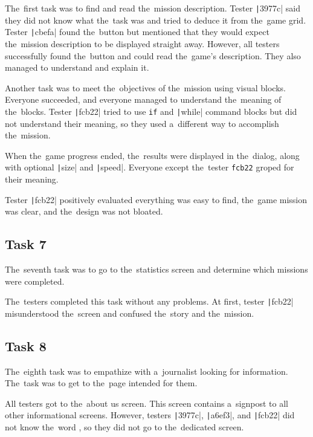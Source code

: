 The~first task was to find and read the~mission description.
Tester \texttt|3977c| said they did not know what the~task was and tried to deduce it from the~game grid.
Tester \texttt|cbefa| found the~button but mentioned that they would expect the~mission description to be displayed straight away.
However, all testers successfully found the~button and could read the~game's description.
They also managed to understand and explain it.

Another task was to meet the~objectives of the~mission using visual blocks.
Everyone succeeded, and everyone managed to understand the~meaning of the~blocks.
Tester \texttt|fcb22| tried to use \mintinline {text}|if| and \texttt|while| command blocks but did not understand their meaning, so they used a~different way to accomplish the~mission.

When the~game progress ended, the~results were displayed in the~dialog, along with optional \texttt|size| and \texttt|speed|.
Everyone except the~tester \mintinline {text}|fcb22| groped for their meaning.

Tester \texttt|fcb22| positively evaluated everything was easy to find, the~game mission was clear, and the~design was not bloated.

\subsection*{Task 7}

The~seventh task was to go to the~statistics screen and determine which missions were completed.

The~testers completed this task without any problems.
At first, tester \texttt|fcb22| misunderstood the~screen and confused the~story and the~mission.

\subsection*{Task 8}

The~eighth task was to empathize with a~journalist looking for information.
The~task was to get to the~page intended for them.

All testers got to the~about us screen.
This screen contains a~signpost to all other informational screens.
However, testers \texttt|3977c|, \texttt|a6ef3|, and \texttt|fcb22| did not know the~word , so they did not go to the~dedicated screen.

